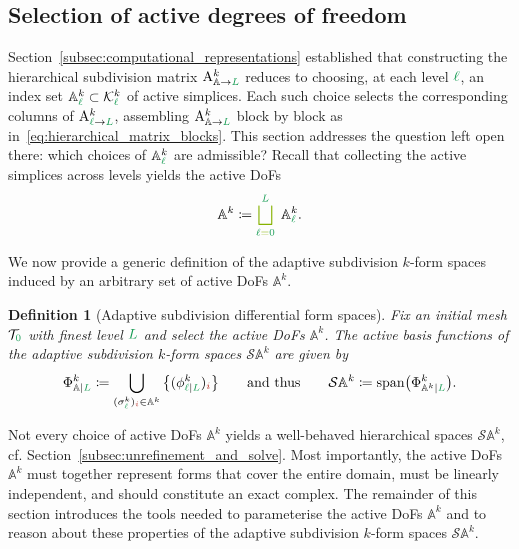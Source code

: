\documentclass[a4paper, 12pt]{article}
\newcommand{\guidance}[1]{{\color{lime!70!black} #1}}
\newcommand{\green}{\color{ForestGreen}}
\newcommand{\brickred}{\color{BrickRed}}
\newcommand{\T}{\mathcal{T}}
\newcommand{\K}{\mathcal{K}}
\newcommand{\simplexname}{\sigma}
\newcommand{\simplex}[3]{\freeQ{\simplexname}{#1}{#2}{#3}}
\newcommand{\coarseIdxone}{{\brickred i}}
\renewcommand{\l}{{\green\ell}}
\renewcommand{\L}{{\green L}}
\newcommand{\lzero}{{\green 0}}
\newcommand{\constrQ}[5]{ ( {#1}^{#2}_{#3 \vert #4} )_{#5}} %
\newcommand{\constrVec}[4]{ {#1}^{#2}_{#3 \vert #4} }
\newcommand{\freeQ}[4]{ ( {#1}^{#2}_{#3} )_{#4}}
\newcommand{\Amat}[3]{\mathbf{\mathrm{A}}^{#1}_{#2 \to #3}}
\newcommand{\SDFbasis}{\phi}
\newcommand{\SDFbases}{\Phi}
\newcommand{\activeDoFs}{\mathbb{A}}
\newcommand{\activeDoFSet}[2]{\activeDoFs^{#1}_{#2}}
\newcommand{\activeSDFspaces}[2]{\mathcal{S}\activeDoFSet{#1}{#2}}
\newtheorem{definition}[theorem]{Definition}
\theoremstyle{definition}
\theoremstyle{plain}
\numberwithin{equation}{section}
\begin{document}
\subsection{Selection of active degrees of freedom}
\label{subsec:selecting_active_dofs}

Section~\ref{subsec:computational_representations} established that constructing the hierarchical subdivision matrix $\Amat{k}{\activeDoFs}{\L}$ reduces to choosing, at each level $\l$, an index set $\activeDoFSet{k}{\l} \subset \K^k_\l$ of active simplices. Each such choice selects the corresponding columns of $\Amat{k}{\l}{\L}$, assembling $\Amat{k}{\activeDoFs}{\L}$ block by block as in~\eqref{eq:hierarchical_matrix_blocks}. This section addresses the question left open there: which choices of $\activeDoFSet{k}{\l}$ are admissible? Recall that collecting the active simplices across levels yields the active DoFs
\begin{equation}
    \label{eq:activeDoFs}
    \activeDoFSet{k}{} \coloneq \guidance{\bigsqcup_{\l=\lzero}^{\L}} \;\, \activeDoFSet{k}{\l}.
\end{equation}

We now provide a generic definition of the adaptive subdivision $k$-form spaces induced by an arbitrary set of active DoFs $\activeDoFSet{k}{}$.

\begin{definition}[Adaptive subdivision differential form spaces]
    \label{def:generic_adaptive_function_spaces}
    Fix an initial mesh $\T_{\lzero}$ with finest level $\L$ and select the active DoFs $\activeDoFSet{k}{}$. The \emph{active basis functions} of the \emph{adaptive subdivision $k$-form spaces} $\activeSDFspaces{k}{}$ are given by
    \begin{equation}
        \constrVec{\SDFbases}{k}{\activeDoFs}{\L} \coloneqq \bigcup_{\simplex{k}{\l}{\coarseIdxone} \in \activeDoFSet{k}{}} \big\{ \constrQ{\SDFbasis}{k}{\l}{\L}{\coarseIdxone} \big\} \qquad \text{and thus} \qquad \activeSDFspaces{k}{} \coloneqq \mathrm{span}\big( \constrVec{\SDFbases}{k}{\activeDoFSet{k}{}}{\L} \big).
    \end{equation}
\end{definition}

Not every choice of active DoFs $\activeDoFSet{k}{}$ yields a well-behaved hierarchical spaces $\activeSDFspaces{k}{}$, cf. Section~\ref{subsec:unrefinement_and_solve}. Most importantly, the active DoFs $\activeDoFSet{k}{}$ must together represent forms that cover the entire domain, must be linearly independent, and should constitute \guidance{an} exact complex. The remainder of this section introduces the tools needed to parameterise the active DoFs $\activeDoFSet{k}{}$ and to reason about these properties of the adaptive subdivision $k$-form spaces $\activeSDFspaces{k}{}$.
\end{document}
